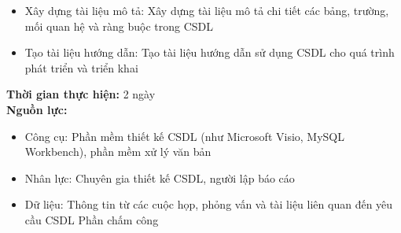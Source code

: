 {\begin{minipage}{\textwidth}
\begin{itemize}
        \item Xây dựng tài liệu mô tả: Xây dựng tài liệu mô tả chi tiết các bảng, trường, mối quan hệ và ràng buộc trong CSDL
        \item Tạo tài liệu hướng dẫn: Tạo tài liệu hướng dẫn sử dụng CSDL cho quá trình phát triển và triển khai
    \end{itemize}
    \noindent \textbf{Thời gian thực hiện:} 2 ngày \\
    \noindent \textbf{Nguồn lực:}
    \begin{itemize}
        \item Công cụ: Phần mềm thiết kế CSDL (như Microsoft Visio, MySQL Workbench), phần mềm xử lý văn bản
        \item Nhân lực: Chuyên gia thiết kế CSDL, người lập báo cáo
        \item Dữ liệu: Thông tin từ các cuộc họp, phỏng vấn và tài liệu liên quan đến yêu cầu CSDL Phần chấm công
    \end{itemize}
    \end{minipage}
}
\newpage
{}    
